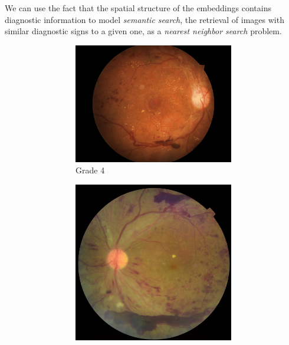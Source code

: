 We can use the fact that the spatial structure of the embeddings contains diagnostic information to model \textit{semantic search}, the retrieval of images with similar diagnostic signs to a given one, as a \textit{nearest neighbor search} problem.

\begin{figure}[tb]
    \captionsetup[subfigure]{labelformat=empty}
     \centering
     \begin{subfigure}[b]{\textwidth}
        \begin{subfigure}[b]{0.32\textwidth}
            \centering
            \includegraphics[width=\textwidth, height=0.2\textheight]{figures/chapter6/similar/16473_right.jpeg}
            \caption{Grade 4}
         \end{subfigure}
         \hfill
         \begin{subfigure}[b]{0.32\textwidth}
            \includegraphics[width=\textwidth, height=0.2\textheight]{figures/chapter6/similar/15975_left.jpeg}

\end{subfigure}
\end{subfigure}
\end{figure}
